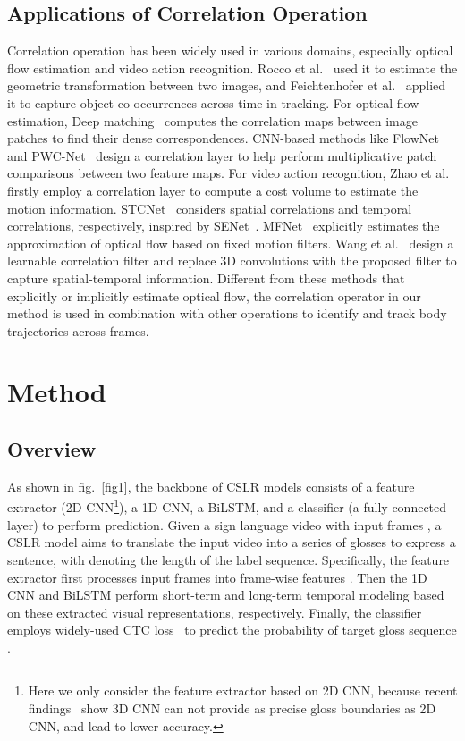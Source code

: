 \documentclass[10pt,twocolumn,letterpaper]{article}
\begin{document}
\subsection{Applications of Correlation Operation}
Correlation operation has been widely used in various domains, especially optical flow estimation and video action recognition. Rocco et al.~\cite{rocco2017convolutional} used it to estimate the geometric transformation between two images, and Feichtenhofer
et al.~\cite{feichtenhofer2017detect} applied it to capture object co-occurrences across time in tracking. For optical flow estimation, Deep matching~\cite{weinzaepfel2013deepflow} computes the correlation maps between image patches to find their dense correspondences. CNN-based methods like FlowNet~\cite{dosovitskiy2015flownet} and PWC-Net~\cite{sun2018pwc} design a correlation layer to help perform multiplicative patch comparisons between two feature maps. For video action recognition, Zhao et al.~\cite{zhao2018recognize} firstly employ a correlation layer to compute a cost volume to estimate the motion information. STCNet~\cite{diba2018spatio} considers spatial correlations and temporal correlations, respectively, inspired by SENet~\cite{hu2018squeeze}. MFNet~\cite{lee2018motion} explicitly estimates the approximation of optical flow based on fixed motion filters. Wang et al.~\cite{wang2020video} design a learnable correlation filter and replace 3D convolutions with the proposed filter to capture spatial-temporal information. Different from these methods that explicitly or implicitly estimate optical flow, the correlation operator in our method is used in combination with other operations to identify and track body trajectories across frames.

\section{Method}
\subsection{Overview}
As shown in fig.~\ref{fig1}, the backbone of CSLR models consists of a feature extractor (2D CNN\footnote{Here we only consider the feature extractor based on 2D CNN, because recent findings~\cite{adaloglou2021comprehensive,zuo2022c2slr} show 3D CNN can not provide as precise gloss boundaries as 2D CNN, and lead to lower accuracy. }), a 1D CNN, a BiLSTM, and a classifier (a fully connected layer) to perform prediction. Given a sign language video with  input frames , a CSLR model aims to translate the input video into a series of glosses  to express a sentence, with  denoting the length of the label sequence. Specifically, the feature extractor first processes input frames into frame-wise features . Then the 1D CNN and BiLSTM perform short-term and long-term temporal modeling based on these extracted visual representations, respectively. Finally, the classifier employs widely-used CTC loss~\cite{graves2006connectionist} to predict the probability of target gloss sequence .
\end{document}
